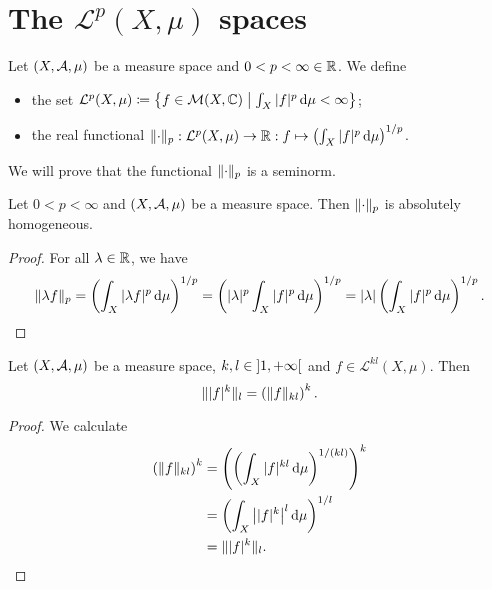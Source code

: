 \section{The $\mathcal{L}^p(X,\mu)$ spaces}
\begin{definition}
Let $\sSet{X,\mathcal{A},\mu}$ be a measure space and $0<p<\infty \in \mathbb{R}$. We define
\begin{itemize}
\item the set $\mathcal{L}^p(X,\mu) \defeq \setbuilder{f\in \meas(X,\C)}{\int_X |f|^p\diff{\mu} <\infty}$;
\item the real functional $\lVert\cdot\rVert_{p}: \mathcal{L}^p(X,\mu)\to \mathbb{R}: f\mapsto \left(\int_X |f|^p\operatorname{d \!}{\mu}\right)^{1/p}$.
\end{itemize}
\end{definition}
We will prove that the functional $\lVert\cdot\rVert_{p}$ is a seminorm.

\begin{lemma} \label{pNormAbsolutelyHomogeneous}
Let $0< p<\infty$ and $\sSet{X,\mathcal{A},\mu}$ be a measure space. Then $\lVert\cdot\rVert_p$ is absolutely homogeneous.
\end{lemma}
\begin{proof}
For all $\lambda\in \mathbb{R}$, we have
\[ \lVert\lambda f\rVert_{p} = \left(\int_X |\lambda f|^p\operatorname{d \!}{\mu}\right)^{1/p} = \left(|\lambda|^p\int_X |f|^p\operatorname{d \!}{\mu}\right)^{1/p} = |\lambda|\left(\int_X |f|^p\operatorname{d \!}{\mu}\right)^{1/p}. \]
\end{proof}

\begin{lemma} \label{pnormLemma}
Let $\sSet{X,\mathcal{A},\mu}$ be a measure space, $k,l\in\interval[o]{1,+\infty}$ and $f\in \mathcal{L}^{kl}(X,\mu)$. Then
\[ \lVert|f|^k\rVert_l = \left(\lVert f\rVert_{kl}\right)^k. \]
\end{lemma}
\begin{proof}
We calculate
\begin{align*}
\left(\lVert f\rVert_{kl}\right)^k &= \left(\left(\int_X|f|^{kl}\operatorname{d \!}{\mu}\right)^{1/(kl)}\right)^{k} \\
&= \left(\int_X\big||f|^{k}\big|^l\operatorname{d \!}{\mu}\right)^{1/l} \\
&= \lVert|f|^k\rVert_l.
\end{align*}
\end{proof}

